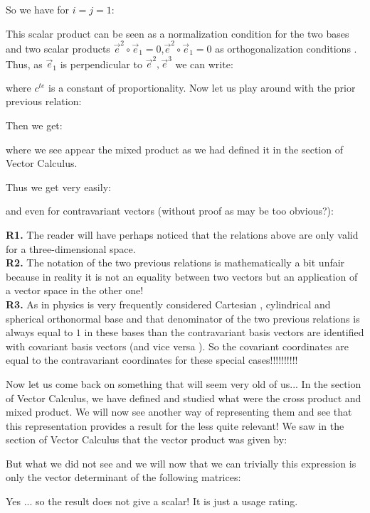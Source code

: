 	So we have for $i=j=1$:
	
	This scalar product can be seen as a normalization condition for the two bases and two scalar products $\vec{e}^2\circ\vec{e}_1=0$,$\vec{e}^2\circ\vec{e}_1=0$ as orthogonalization conditions . Thus, as $\vec{e}_1$ is perpendicular to $\vec{e}^2,\vec{e}^3$ we can write:
	
	where $c^{te}$ is a constant of proportionality. Now let us play around with the prior previous relation:
	
	Then we get:
	
	where we see appear the mixed product as we had defined it in the section of Vector Calculus.
	
	Thus we get very easily:
	
	and even for contravariant vectors (without proof as may be too obvious?):
	
	\begin{tcolorbox}[title=Remarks,colframe=black,arc=10pt]
	\textbf{R1.} The reader will have perhaps noticed that the relations above are only valid for a three-dimensional space.\\
	
	\textbf{R2.} The notation of the two previous relations is mathematically a bit unfair because in reality it is not an equality between two vectors but an application of a vector space in the other one!\\
	
	\textbf{R3.} As in physics is very frequently considered Cartesian , cylindrical and spherical orthonormal base and that denominator of the two previous relations is always equal to $1$ in these bases than the contravariant basis vectors are identified with covariant basis vectors (and vice versa ). So the covariant coordinates are equal to the contravariant coordinates for these special cases!!!!!!!!!! 
	\end{tcolorbox}	
	Now let us come back on something that will seem very old of us... In the section of Vector Calculus, we have defined and studied what were the cross product and mixed product. We will now see another way of representing them and see that this representation provides a result for the less quite relevant!
	We saw in the section of Vector Calculus that the vector product was given by:
	
	But what we did not see and we will now that we can trivially this expression is only the vector determinant of the following matrices:
	
	Yes ... so the result does not give a scalar! It is just a usage rating.
	
